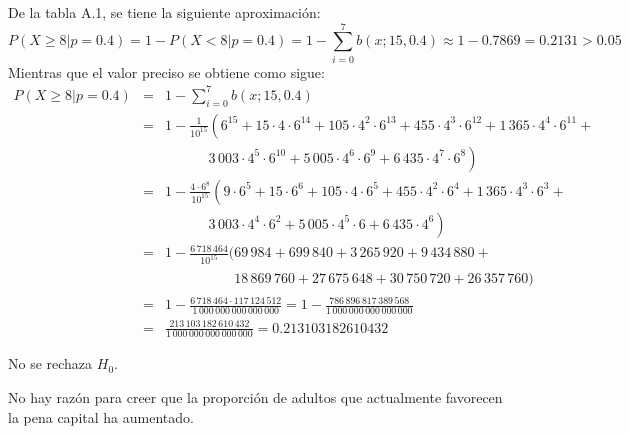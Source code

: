 \begin{solucion}
 \begin{valorp}
  De la tabla A.1, se tiene la siguiente aproximaci\'on:
  \begin{equation*}
   P\left( X \geq 8 | p = 0.4 \right) = 1 - P\left( X < 8 | p = 0.4 \right)
   = 1 - \sum_{i=0}^{7} b\left( x; 15, 0.4 \right)
   \approx 1 - 0.7869 = 0.2131 > 0.05
  \end{equation*}
  Mientras que el valor preciso se obtiene como sigue:
  \begin{eqnarray*}
   P\left( X \geq 8 | p = 0.4 \right)
   & = & 1 - \sum_{i=0}^{7} b\left( x; 15, 0.4 \right) \\
   & = & 1 - \frac{1}{10^{15}} \left( 6^{15} + 15\cdot 4\cdot 6^{14} +
   105\cdot 4^2 \cdot 6^{13} + 455 \cdot 4^3 \cdot 6^{12} +
   1\,365 \cdot 4^4 \cdot 6^{11} + \right. \\
   & & \phantom{1 - \frac{1}{10^{15}}} \left.
   3\,003 \cdot 4^5 \cdot 6^{10} +
   5\,005 \cdot 4^6 \cdot 6^9 + 6\,435 \cdot 4^7 \cdot 6^8 \right) \\
   & = & 1 - \frac{4\cdot 6^8}{10^{15}} \left( 9 \cdot 6^5 + 15\cdot 6^6 +
   105\cdot 4 \cdot 6^5 + 455 \cdot 4^2 \cdot 6^4 +
   1\,365 \cdot 4^3 \cdot 6^3 + \right. \\
   & & \phantom{1 - \frac{6^8}{10^15}} \left. 
   3\,003 \cdot 4^4 \cdot 6^2 +
   5\,005 \cdot 4^5 \cdot 6 + 6\,435 \cdot 4^6 \right) \\
   & = & 1 - \frac{6\,718\,464}{10^{15}}
   (69\,984 + 699\,840 + 3\,265\,920 + 9\,434\,880 + \\
   & & \phantom{1 - \frac{6\,718\,464}{10^{15}}(}
   18\,869\,760 + 27\,675\,648 +
   30\,750\,720 + 26\,357\,760) \\
   & = & 1 - \frac{6\,718\,464 \cdot 117\,124\,512}{1\,000\,000\,000\,000\,000}
   = 1 - \frac{786\,896\,817\,389\,568}{1\,000\,000\,000\,000\,000} \\
   & = & \frac{213\,103\,182\,610\,432}{1\,000\,000\,000\,000\,000}
   = 0.213103182610432
  \end{eqnarray*}

 \end{valorp}

 \begin{decision}
  No se rechaza $H_0$.
 \end{decision}

 \begin{conclusion}
  No hay raz\'on para creer que la proporci\'on de adultos que actualmente favorecen la pena
  capital ha aumentado.
 \end{conclusion}


\end{solucion}
